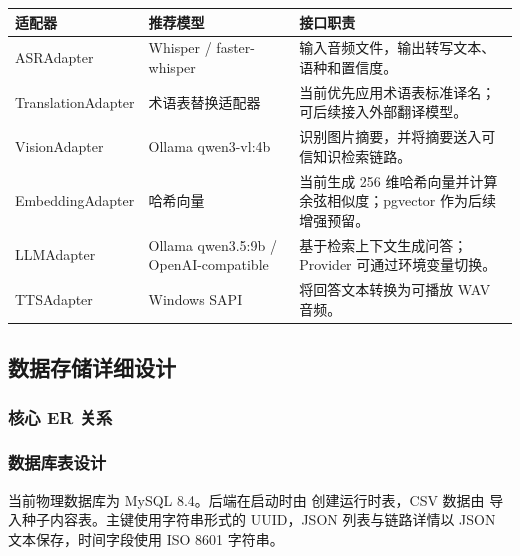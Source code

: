 \begin{longtable}{p{3.7cm}p{3.2cm}p{6.0cm}}
\toprule
适配器 & 推荐模型 & 接口职责 \\
\midrule
ASRAdapter & Whisper / faster-whisper & 输入音频文件，输出转写文本、语种和置信度。 \\
TranslationAdapter & 术语表替换适配器 & 当前优先应用术语表标准译名；可后续接入外部翻译模型。 \\
VisionAdapter & Ollama qwen3-vl:4b & 识别图片摘要，并将摘要送入可信知识检索链路。 \\
EmbeddingAdapter & 哈希向量 & 当前生成 256 维哈希向量并计算余弦相似度；pgvector 作为后续增强预留。 \\
LLMAdapter & Ollama qwen3.5:9b / OpenAI-compatible & 基于检索上下文生成问答；Provider 可通过环境变量切换。 \\
TTSAdapter & Windows SAPI & 将回答文本转换为可播放 WAV 音频。 \\
\bottomrule
\end{longtable}

\subsection{数据存储详细设计}

\subsubsection{核心 ER 关系}


\subsubsection{数据库表设计}

当前物理数据库为 MySQL 8.4。后端在启动时由  创建运行时表，CSV 数据由  导入种子内容表。主键使用字符串形式的 UUID，JSON 列表与链路详情以 JSON 文本保存，时间字段使用 ISO 8601 字符串。

